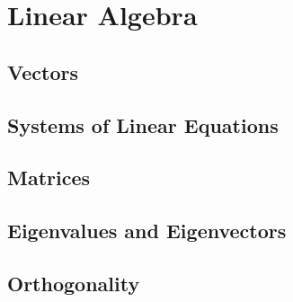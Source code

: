 \tableofcontents
\newpage


\part{Linear Algebra}
  \chapter{Vectors}
    
    
    
    

  \chapter{Systems of Linear Equations}
    
    
    
    
    

  \chapter{Matrices}
    
    
    
    
    
    
    

  \chapter{Eigenvalues and Eigenvectors}
    
    
    
    
    
    

  \chapter{Orthogonality}
    
    
    
    
    

